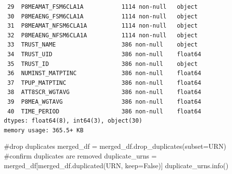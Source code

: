 \documentclass[
  letterpaper,
  DIV=11,
  numbers=noendperiod]{scrartcl}
\newenvironment{Shaded}{\begin{snugshade}}{\end{snugshade}}
\newcommand{\CommentTok}[1]{\textcolor[rgb]{0.37,0.37,0.37}{#1}}
\newcommand{\NormalTok}[1]{\textcolor[rgb]{0.00,0.23,0.31}{#1}}
\newcommand{\OperatorTok}[1]{\textcolor[rgb]{0.37,0.37,0.37}{#1}}
\newcommand{\StringTok}[1]{\textcolor[rgb]{0.13,0.47,0.30}{#1}}
\newcommand{\VariableTok}[1]{\textcolor[rgb]{0.07,0.07,0.07}{#1}}
\begin{document}
\begin{verbatim}
 29  P8MEAMAT_FSM6CLA1A           1114 non-null   object 
 30  P8MEAENG_FSM6CLA1A           1114 non-null   object 
 31  P8MEAMAT_NFSM6CLA1A          1114 non-null   object 
 32  P8MEAENG_NFSM6CLA1A          1114 non-null   object 
 33  TRUST_NAME                   386 non-null    object 
 34  TRUST_UID                    386 non-null    float64
 35  TRUST_ID                     386 non-null    object 
 36  NUMINST_MATPTINC             386 non-null    float64
 37  TPUP_MATPTINC                386 non-null    float64
 38  ATT8SCR_WGTAVG               386 non-null    float64
 39  P8MEA_WGTAVG                 386 non-null    float64
 40  TIME_PERIOD                  386 non-null    float64
dtypes: float64(8), int64(3), object(30)
memory usage: 365.5+ KB
\end{verbatim}

\begin{Shaded}
\begin{Highlighting}[]
\CommentTok{\#drop duplicates}
\NormalTok{merged\_df }\OperatorTok{=}\NormalTok{ merged\_df.drop\_duplicates(subset}\OperatorTok{=}\StringTok{\textquotesingle{}URN\textquotesingle{}}\NormalTok{)}
\CommentTok{\#confirm duplicates are removed }
\NormalTok{duplicate\_urns }\OperatorTok{=}\NormalTok{ merged\_df[merged\_df.duplicated(}\StringTok{\textquotesingle{}URN\textquotesingle{}}\NormalTok{, keep}\OperatorTok{=}\VariableTok{False}\NormalTok{)] }
\NormalTok{duplicate\_urns.info()}
\end{Highlighting}
\end{Shaded}
\end{document}

